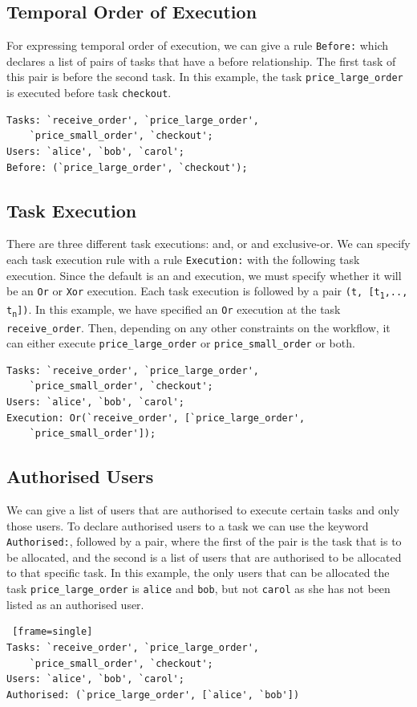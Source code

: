 \documentclass[a4paper]{report}
\begin{document}
\subsection{Temporal Order of Execution}
For expressing temporal order of execution, we can give a rule \texttt{Before:} which declares a list of pairs of tasks that have a before relationship. The first task of this pair is before the second task. In this example, the task \texttt{price\_large\_order} is executed before task \texttt{checkout}.
\begin{lstlisting}[frame=single]
Tasks: `receive_order', `price_large_order', 
	`price_small_order', `checkout'; 
Users: `alice', `bob', `carol';
Before: (`price_large_order', `checkout');
\end{lstlisting}

\subsection{Task Execution}
There are three different task executions: and, or and exclusive-or. We can specify each task execution rule with a rule \texttt{Execution:} with the following task execution. Since the default is an and execution, we must specify whether it will be an \texttt{Or} or \texttt{Xor} execution. Each task execution is followed by a pair \texttt{(t, [t\textsubscript{1},.., t\textsubscript{n}])}. In this example, we have specified an \texttt{Or} execution at the task \texttt{receive\_order}. Then, depending on any other constraints on the workflow, it can either execute \texttt{price\_large\_order} or \texttt{price\_small\_order} or both.
\begin{lstlisting}[frame=single]
Tasks: `receive_order', `price_large_order', 
	`price_small_order', `checkout'; 
Users: `alice', `bob', `carol';
Execution: Or(`receive_order', [`price_large_order', 
	`price_small_order']);
\end{lstlisting}

\subsection{Authorised Users}
We can give a list of users that are authorised to execute certain tasks and only those users. To declare authorised users to a task we can use the keyword \texttt{Authorised:}, followed by a pair, where the first of the pair is the task that is to be allocated, and the second is a list of users that are authorised to be allocated to that specific task. In this example, the only users that can be allocated the task \texttt{price\_large\_order} is \texttt{alice} and \texttt{bob}, but not \texttt{carol} as she has not been listed as an authorised user.
\begin{lstlisting} [frame=single]
Tasks: `receive_order', `price_large_order',
	`price_small_order', `checkout'; 
Users: `alice', `bob', `carol';
Authorised: (`price_large_order', [`alice', `bob'])
\end{lstlisting}
\end{document}
